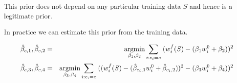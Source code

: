 {{This prior does not depend on any particular training data $S$ and hence is a legitimate prior.

\vfill
In practice we can estimate this prior from the training data.

\begin{eqnarray*}
\hat{\beta}_{c,1},\hat{\beta}_{c,2} & = & \operatorname*{argmin}_{\beta_1,\beta_2} \sum_{i: c_i = c}\;(w_i^f(S) - (\beta_1 w_i^0 + \beta_2))^2 \\
\hat{\beta}_{c,3},\hat{\beta}_{c,4} &  = & \operatorname*{argmin}_{\beta_3,\beta_4} \sum_{i: c_i = c}\;((w_i^f(S) - (\hat{\beta}_{c_i,1} w_i^0 + \hat{\beta}_{c_i,2}))^2 - (\beta_3 w_i^0 + \beta_4))^2
\end{eqnarray*}
}


}


